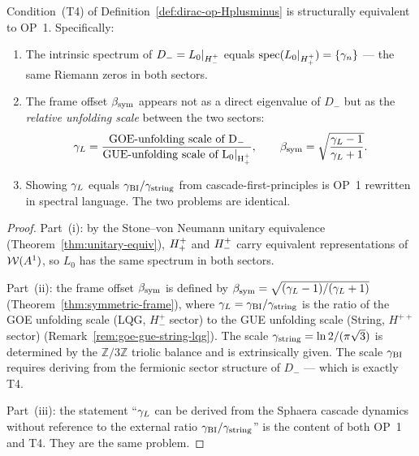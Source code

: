 \begin{theorem}[OP~2 (T4) = OP~1: $\bsym$ as spectral scale ratio]
\label{thm:op2-T4-equals-op1}
Condition~(T4) of Definition~\ref{def:dirac-op-Hplusminus} is
structurally equivalent to OP~1. Specifically:
\begin{enumerate}[label=(\roman*)]
  \item The intrinsic spectrum of $D_{-} = L_0|_{H^+_-}$ equals
    $\mathrm{spec}(L_0|_{H^+_+}) = \{\gamma_n\}$ --- the same
    Riemann zeros in both sectors.
  \item The frame offset $\bsym$ appears not as a direct eigenvalue
    of $D_{-}$ but as the \emph{relative unfolding scale} between
    the two sectors:
    \[
      \gamma_L = \frac{\mathrm{GOE\text{-}unfolding\text{ scale of }D_{-}}}
                 {\mathrm{GUE\text{-}unfolding\text{ scale of }L_0|_{H^+_+}}},
      \qquad
      \beta_{\mathrm{sym}} = \sqrt{\frac{\gamma_L-1}{\gamma_L+1}}.
    \]
  \item Showing $\gamma_L$ equals $\gamma_{\mathrm{BI}}/\gamma_{\mathrm{string}}$ from cascade-first-principles
    is OP~1 rewritten in spectral language. The two problems are identical.
\end{enumerate}
\end{theorem}

\begin{proof}
Part~(i): by the Stone--von Neumann unitary equivalence
(Theorem~\ref{thm:unitary-equiv}), $H^+_+$ and $H^+_-$ carry
equivalent representations of $\mathcal{W}(A^1)$, so $L_0$ has the same spectrum in
both sectors.

Part~(ii): the frame offset $\bsym$ is defined by
$\beta_{\mathrm{sym}}=\sqrt{(\gamma_L-1)/(\gamma_L+1)}$ (Theorem~\ref{thm:symmetric-frame}),
where $\gamma_L=\gamma_{\mathrm{BI}}/\gamma_{\mathrm{string}}$ is the ratio of the GOE unfolding scale
(LQG, $H^+_-$ sector) to the GUE unfolding scale (String, $H^{++}$ sector)
(Remark~\ref{rem:goe-gue-string-lqg}).
The scale $\gamma_{\mathrm{string}} = \ln 2/(\pi\sqrt{3})$ is determined by the
$\mathbb{Z}/3\mathbb{Z}$ triolic balance and is extrinsically given.
The scale $\gamma_{\mathrm{BI}}$ requires deriving from the fermionic sector structure
of $D_{-}$ --- which is exactly T4.

Part~(iii): the statement ``$\gamma_L$ can be derived from the Sphaera
cascade dynamics without reference to the external ratio
$\gamma_{\mathrm{BI}}/\gamma_{\mathrm{string}}$'' is the content of both OP~1 and T4.
They are the same problem.
\end{proof}

